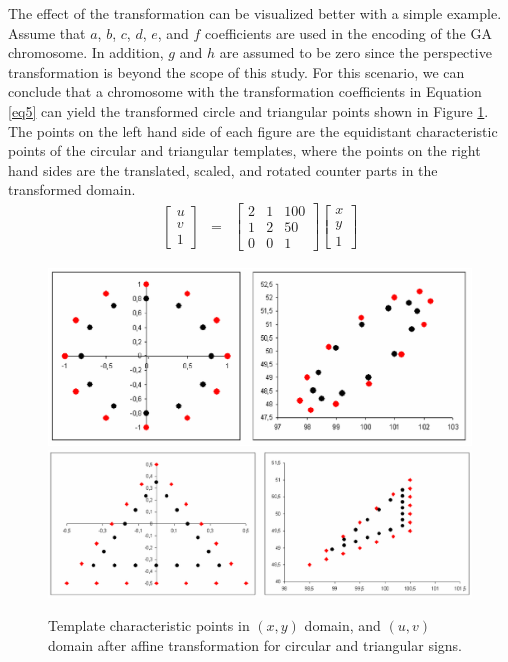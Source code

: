 \documentclass[review,number]{elsarticle}
\begin{document}
The effect of the transformation can be visualized better with a simple example. Assume that $a$, $b$, $c$, $d$, $e$, and $f$ coefficients are used in the encoding of the GA chromosome. In addition, $g$ and $h$ are assumed to be zero since the perspective transformation is beyond the scope of this study. For this scenario, we can conclude that a chromosome with the transformation coefficients in Equation \ref{eq5} can yield the transformed circle and triangular points shown in Figure \ref{signfig07}. The points on the left hand side of each figure are the equidistant characteristic points of the circular and triangular templates, where the points on the right hand sides are the translated, scaled, and rotated counter parts in the transformed domain.
\begin{eqnarray}
\label{eq5}
\begin{bmatrix}
  u\\
  v\\
  1
\end{bmatrix}
&=&
\begin{bmatrix}
  2 & 1 & 100\\
  1 & 2 &  50\\
  0 & 0 &   1
\end{bmatrix}
\begin{bmatrix}
  x\\
  y\\
  1
\end{bmatrix}
\end{eqnarray}

\begin{figure}[H]
\begin{center}
\includegraphics[scale=0.17]{img/signfig06.eps}\\
\includegraphics[scale=0.13]{img/signfig07.eps}
\caption{Template characteristic points in $(x, y)$ domain, and $(u, v)$ domain after affine transformation for circular and triangular signs.}
\label{signfig07}
\end{center}
\end{figure}
\end{document}
